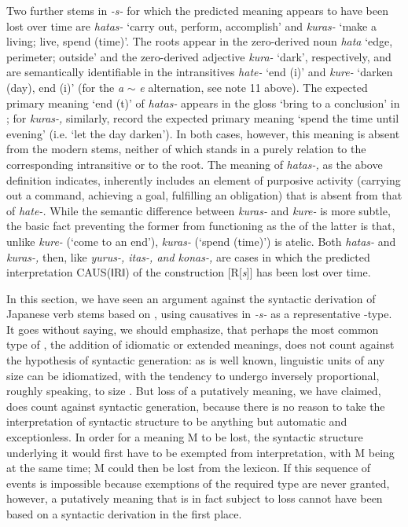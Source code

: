 \documentclass[output=paper,
modfonts
]{LSP/langsci}
\begin{document}
Two further stems in \textit{-s-} for which the predicted 
meaning appears to have been lost over time are \textit{hatas-} `carry
out, perform, accomplish' and \textit{kuras-} `make a living; live, spend
(time)'. The roots appear in the zero-derived noun \textit{hata} `edge,
perimeter; outside' and the zero-derived adjective  \textit{kura-}
`dark', respectively, and are semantically identifiable in the
intransitives \textit{hate-} `end (i)' and \textit{kure-} `darken (day), end
(i)' (for the \textit{a} $\sim$ \textit{e} alternation, see note 11 above). The
expected primary meaning `end (t)' of \textit{hatas-} appears in the gloss
`bring to a conclusion' in \citet{omodaka1967a}; for \textit{kuras-,}
similarly, \citeauthor{omodaka1967a} record the expected primary meaning `spend the
time until evening' (i.e. `let the day darken'). In both cases, however,
this  meaning is absent from the modern stems, neither of
which stands in a purely  relation to the corresponding
intransitive or to the root. The meaning of \textit{hatas-,} as the above
definition indicates, inherently includes an element of purposive
activity (carrying out a command, achieving a goal, fulfilling an
obligation) that is absent from that of \textit{hate-.} While the semantic
difference between \textit{kuras-} and \textit{kure-} is more subtle, the
basic fact preventing the former from functioning as the  of
the latter is that, unlike \textit{kure-} (`come to an end'),
\textit{kuras-} (`spend (time)') is atelic. Both \textit{hatas-} and
\textit{kuras-,} then, like \textit{yurus-, itas-, and konas-,} are cases in
which the predicted interpretation CAUS(ǁRǁ) of the construction
{[}R{[}\textit{s}{]}{]} has been lost over time.

In this section, we have seen an argument against the syntactic
derivation of Japanese verb stems based on , using
causatives in \textit{-s-} as a representative -type. It goes without
saying, we should emphasize, that perhaps the most common type of
, the addition of idiomatic or extended meanings, does
not count against the hypothesis of syntactic generation: as is well
known, linguistic units of any size can be idiomatized, with the
tendency to undergo  inversely proportional, roughly
speaking, to size \citep[14]{sciullo1987a}. But loss of a
putatively  meaning, we have claimed, does count against
syntactic generation, because there is no reason to take the
 interpretation of syntactic structure to be anything but
automatic and exceptionless. In order for a  meaning M to
be lost, the syntactic structure underlying it would first have to be
exempted from  interpretation, with M being  at
the same time; M could then be lost from the lexicon. If this sequence
of events is impossible because exemptions of the required type are
never granted, however, a putatively  meaning that is in
fact subject to loss cannot have been based on a syntactic derivation in
the first place.
\end{document}
